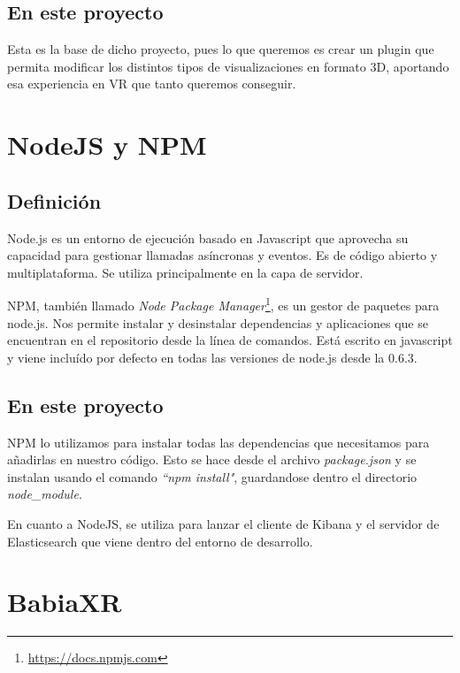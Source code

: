 \documentclass[a4paper, 12pt]{book}
\begin{document}
\subsection{En este proyecto}
Esta es la base de dicho proyecto, pues lo que queremos es crear un plugin que permita modificar los distintos tipos de visualizaciones en formato 3D, aportando esa experiencia en VR que tanto queremos conseguir.



\section{NodeJS y NPM}
\label{sec:nodejs}
\subsection{Definición}
Node.js \cite{syed:_nodejs} es un entorno de ejecución basado en Javascript que aprovecha su capacidad para gestionar llamadas asíncronas y eventos. Es de código abierto y multiplataforma. Se utiliza principalmente en la capa de servidor.


NPM, también llamado \textit{Node Package Manager}\footnote{\url{https://docs.npmjs.com}}, es un gestor de paquetes para node.js. Nos permite instalar y desinstalar dependencias y aplicaciones que se encuentran en el repositorio desde la línea de comandos. Está escrito en javascript y viene incluído por defecto en todas las versiones de node.js desde la 0.6.3.

\subsection{En este proyecto}

NPM lo utilizamos para instalar todas las dependencias que necesitamos para añadirlas en nuestro código. Esto se hace desde el archivo \textit{package.json} y se instalan usando el comando \textit{``npm install"}, guardandose dentro el directorio \textit{node\_module}.

En cuanto a NodeJS, se utiliza para lanzar el cliente de Kibana y el servidor de Elasticsearch que viene dentro del entorno de desarrollo.


\section{BabiaXR}
\label{sec:babiaxr}
\end{document}

